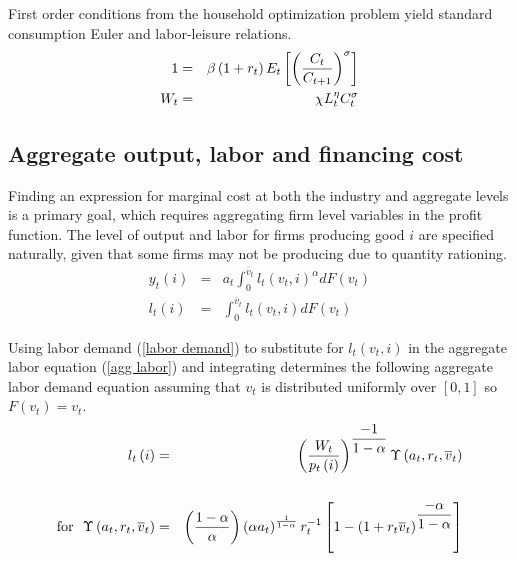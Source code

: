 \documentclass{article}
\begin{document}
First order conditions from the household optimization problem yield
standard consumption Euler and labor-leisure relations.
\begin{eqnarray}
1 &=&\beta \left( 1+r_{t}\right) E_{t}\left[ \left( \frac{C_{t}}{C_{t+1}}%
\right) ^{\sigma }\right]  \notag  \label{Euler} \\
W_{t} &=&\chi L_{t}^{\eta }C_{t}^{\sigma }  \label{labor supply}
\end{eqnarray}

\subsection{Aggregate output, labor and financing cost}

Finding an expression for marginal cost at both the industry and aggregate
levels is a primary goal, which requires aggregating firm level variables in
the profit function. The level of output and labor for firms producing
good $i$ are specified naturally, given that some firms may not be
producing due to quantity rationing.
\begin{eqnarray}
y_{t}\left( i\right) &=&a_{t}\int_{0}^{\overline{v}_{t}}l_{t}\left(
v_{t},i\right) ^{\alpha }dF\left( v_{t}\right)  \label{agg out} \\
l_{t}\left( i\right) &=&\int_{0}^{\overline{v}_{t}}l_{t}\left(
v_{t},i\right) dF\left( v_{t}\right)  \label{agg labor}
\end{eqnarray}

Using labor demand (\ref{labor demand}) to substitute for $l_{t}\left(
v_{t},i\right)$ in the aggregate labor equation (\ref{agg labor}) and
integrating determines the following aggregate labor demand equation
assuming that $v_{t}$ is distributed uniformly over $\left[ 0,1\right]$ so $%
F\left( v_{t}\right) =v_{t}$.
\begin{eqnarray}
l_{t}\left( i\right) &=&\left( \frac{W_{t}}{p_{t}\left( i\right) }\right) ^{%
\dfrac{-1}{1-\alpha }}\Upsilon \left( a_{t},r_{t},\overline{v}_{t}\right)
\label{agg labor sol} \\
&&  \notag \\
\text{for \ }\Upsilon \left( a_{t},r_{t},\overline{v}_{t}\right) &=&\left(
\frac{1-\alpha }{\alpha }\right) \left( \alpha a_{t}\right) ^{\frac{1}{%
1-\alpha }}r_{t}^{-1}\left[ 1-\left( 1+r_{t}\overline{v}_{t}\right) ^{\dfrac{%
-\alpha }{1-\alpha }}\right]  \notag
\end{eqnarray}
\end{document}

